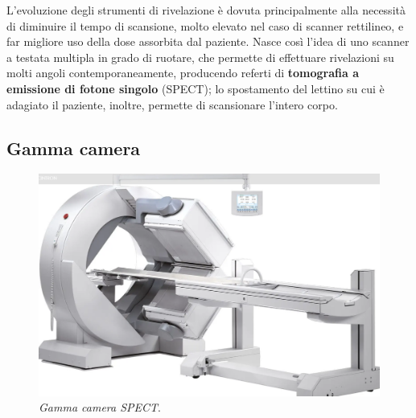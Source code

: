 \documentclass{report}
\numberwithin{equation}{section}
\numberwithin{figure}{section}
\begin{document}
L'evoluzione degli strumenti di rivelazione è dovuta principalmente alla necessità di diminuire il tempo di scansione, molto elevato nel caso di scanner rettilineo, e far migliore uso della dose assorbita dal paziente. Nasce così l'idea di uno scanner a testata multipla in grado di ruotare, che permette di effettuare rivelazioni su molti angoli contemporaneamente, producendo referti di \textbf{tomografia a emissione di fotone singolo} (SPECT); lo spostamento del lettino su cui è adagiato il paziente, inoltre, permette di scansionare l'intero corpo.

\subsection{Gamma camera}
\begin{figure}[htp]
    \centering
    \includegraphics[scale=0.3]{immagini/gammacamera.png}
    \caption{\label{fig:gammacamera} \textit{Gamma camera SPECT}.}
\end{figure}
\end{document}
